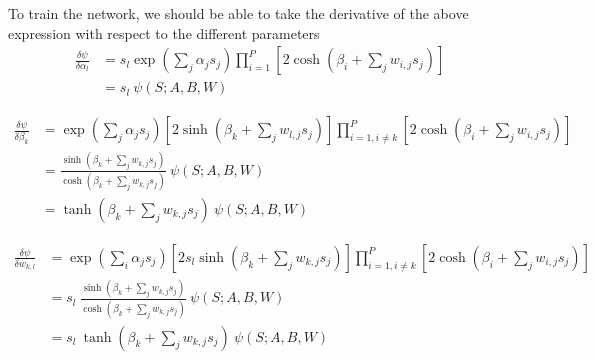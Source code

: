 \documentclass[a4paper]{article}
\begin{document}
To train the network, we should be able to take the derivative of the above expression with respect to the different parameters
\begin{align*}
   \frac{\delta \psi}{\delta \alpha_l} &= s_l \exp \left (\sum_j \alpha_j s_j \right) \prod_{i=1}^P \left [ 2 \cosh \left ( \beta_i  + \sum_{j} w_{i,j} s_j \right)\right]\\
                                       &= s_l\ \psi(S; A, B, W)
\end{align*}

\begin{align*}
    \frac{\delta \psi}{\delta \beta_k} &= \exp \left (\sum_j \alpha_j s_j \right) \left [ 2 \sinh \left (  \beta_k + \sum_{j} w_{l,j} s_j \right)\right] \prod_{i=1, i \neq k}^P \left [ 2 \cosh \left ( \beta_i + \sum_{j} w_{i,j} s_j \right)\right]\\                                 
                                       &= \frac{\sinh \left ( \beta_k + \sum_{j} w_{k,j} s_j \right)}{\cosh \left ( \beta_k + \sum_{j} w_{k,j} s_j \right)}\ \psi(S; A, B, W)\\
                                       &= \tanh\left (\beta_k + \sum_{j} w_{k,j} s_j \right)\ \psi(S; A, B, W)
 \end{align*}

 \begin{align*}
    \frac{\delta \psi}{\delta w_{k,l}} &= \exp \left (\sum_i \alpha_j s_j \right) \left [ 2 s_l \sinh \left ( \beta_k + \sum_{j} w_{k,j} s_j \right)\right] \prod_{i=1, i \neq k}^P \left [ 2 \cosh \left ( \beta_i + \sum_{j} w_{i,j} s_j \right)\right]\\                                 
                                       &= s_l \ \frac{\sinh \left ( \beta_k + \sum_{j} w_{k,j} s_j \right)}{\cosh \left ( \beta_k + \sum_{j} w_{k,j} s_j \right)}\ \psi(S; A, B, W)\\
                                       &= s_l\  \tanh\left ( \beta_k + \sum_{j} w_{k,j} s_j \right)\ \psi(S; A, B, W)
 \end{align*}
\end{document}
